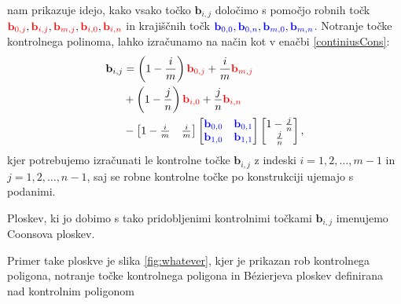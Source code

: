 \documentclass[a4paper,12pt]{article}
\begin{document}
nam prikazuje idejo, kako vsako točko $\mathbf{b}_{i,j}$ določimo s pomočjo 
robnih točk $\color{red} \mathbf{b}_{0,j} \color{black}, \color{red} \mathbf{b}_{i,j} \color{black}, \color{red} \mathbf{b}_{m,j} 
\color{black}, \color{red} \mathbf{b}_{i,0}\color{black} \color{black}, \color{red} \mathbf{b}_{i,n}$ in krajiščnih točk 
$\color{blue} \mathbf{b}_{0,0} \color{black}, \color{blue} \mathbf{b}_{0,n}\color{black}, \color{blue} \mathbf{b}_{m,0}\color{black}, \color{blue} \mathbf{b}_{m,n}$. 
 Notranje točke kontrolnega polinoma, lahko izračunamo na način kot v 
 enačbi \eqref{continiusCons}: 
 \begin{align}
   \label{diskertni}
   \mathbf{b}_{i,j} &= \left(1 - \frac{i}{m}\right) \color{red} \mathbf{b}_{0,j} \color{black}+\frac{i}{m}\color{red}\mathbf{b}_{m,j} \notag \\
    &+ \left(1 - \frac{j}{n}\right)\color{red}\mathbf{b}_{i,0} \color{black}+\frac{j}{n} \color{red}\mathbf{b}_{i,n}\ \\
   &- 
   \begin{bmatrix} 
      1 - \frac{i}{m} & \frac{i}{m}
   \end{bmatrix}
   \begin{bmatrix} 
       \color{blue} \mathbf{b}_{0,0} &  \color{blue} \mathbf{b}_{0,1} \notag\\
       \color{blue} \mathbf{b}_{1,0} &  \color{blue} \mathbf{b}_{1,1}
   \end{bmatrix}
   \begin{bmatrix}
      1 - \frac{j}{n}\\
      \frac{j}{n}
   \end{bmatrix},
\end{align}
kjer potrebujemo izračunati le kontrolne točke 
$\mathbf{b}_{i,j}$ z indeski $i = 1,2,\dots,m-1$ in $j = 1,2,\dots,n-1$, 
saj se robne kontrolne točke po konstrukciji ujemajo s podanimi.

\begin{definicija}
Ploskev, ki jo dobimo s tako pridobljenimi kontrolnimi točkami $\mathbf{b}_{i,j}$
imenujemo Coonsova ploskev.
\end{definicija}

Primer take ploskve je slika \ref{fig:whatever}, kjer je prikazan 
rob kontrolnega poligona, notranje točke kontrolnega poligona in 
Bézierjeva ploskev definirana nad kontrolnim poligonom
\end{document}
